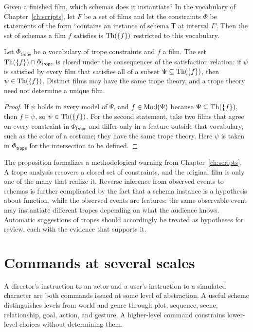 Given a finished film, which schemas does it instantiate? In the vocabulary of Chapter~\ref{ch:scripts}, let $F$ be a set of films and let the constraints $\Phi$ be statements of the form ``contains an instance of schema $\mathsf{T}$ at interval $I$''. Then the set of schemas a film $f$ satisfies is $\operatorname{Th}(\{f\})$ restricted to this vocabulary.

\begin{proposition}[Underdetermination]\label{prop:underdet}
Let $\Phi_{\mathsf{trope}}$ be a vocabulary of trope constraints and $f$ a film. The set $\operatorname{Th}(\{f\})\cap\Phi_{\mathsf{trope}}$ is closed under the consequences of the satisfaction relation: if $\psi$ is satisfied by every film that satisfies all of a subset $\Psi\subseteq\operatorname{Th}(\{f\})$, then $\psi\in\operatorname{Th}(\{f\})$. Distinct films may have the same trope theory, and a trope theory need not determine a unique film.
\end{proposition}

\begin{proof}
If $\psi$ holds in every model of $\Psi$, and $f\in\operatorname{Mod}(\Psi)$ because $\Psi\subseteq\operatorname{Th}(\{f\})$, then $f\models\psi$, so $\psi\in\operatorname{Th}(\{f\})$. For the second statement, take two films that agree on every constraint in $\Phi_{\mathsf{trope}}$ and differ only in a feature outside that vocabulary, such as the color of a costume; they have the same trope theory. Here $\psi$ is taken in $\Phi_{\mathsf{trope}}$ for the intersection to be defined.
\end{proof}

The proposition formalizes a methodological warning from Chapter~\ref{ch:scripts}. A trope analysis recovers a closed set of constraints, and the original film is only one of the many that realize it. Reverse inference from observed events to schemas is further complicated by the fact that a schema instance is a hypothesis about function, while the observed events are features: the same observable event may instantiate different tropes depending on what the audience knows. Automatic suggestions of tropes should accordingly be treated as hypotheses for review, each with the evidence that supports it.

\section{Commands at several scales}

A director's instruction to an actor and a user's instruction to a simulated character are both commands issued at some level of abstraction. A useful scheme distinguishes levels from world and genre through plot, sequence, scene, relationship, goal, action, and gesture. A higher-level command constrains lower-level choices without determining them.

